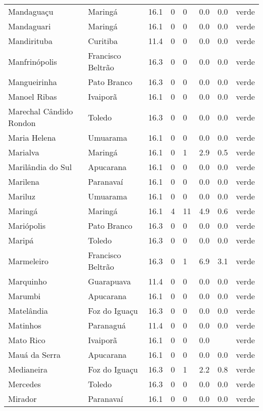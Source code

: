\begin{longtable}{l|lllllll}
  Mandaguaçu & Maringá & 16.1 & 0 & 0 & 0.0 & 0.0 & verde \\ 
  Mandaguari & Maringá & 16.1 & 0 & 0 & 0.0 & 0.0 & verde \\ 
  Mandirituba & Curitiba & 11.4 & 0 & 0 & 0.0 & 0.0 & verde \\ 
  Manfrinópolis & Francisco Beltrão & 16.3 & 0 & 0 & 0.0 & 0.0 & verde \\ 
  Mangueirinha & Pato Branco & 16.3 & 0 & 0 & 0.0 & 0.0 & verde \\ 
  Manoel Ribas & Ivaiporã & 16.1 & 0 & 0 & 0.0 & 0.0 & verde \\ 
  Marechal Cândido Rondon & Toledo & 16.3 & 0 & 0 & 0.0 & 0.0 & verde \\ 
  Maria Helena & Umuarama & 16.1 & 0 & 0 & 0.0 & 0.0 & verde \\ 
  Marialva & Maringá & 16.1 & 0 & 1 & 2.9 & 0.5 & verde \\ 
  Marilândia do Sul & Apucarana & 16.1 & 0 & 0 & 0.0 & 0.0 & verde \\ 
  Marilena & Paranavaí & 16.1 & 0 & 0 & 0.0 & 0.0 & verde \\ 
  Mariluz & Umuarama & 16.1 & 0 & 0 & 0.0 & 0.0 & verde \\ 
  Maringá & Maringá & 16.1 & 4 & 11 & 4.9 & 0.6 & verde \\ 
  Mariópolis & Pato Branco & 16.3 & 0 & 0 & 0.0 & 0.0 & verde \\ 
  Maripá & Toledo & 16.3 & 0 & 0 & 0.0 & 0.0 & verde \\ 
  Marmeleiro & Francisco Beltrão & 16.3 & 0 & 1 & 6.9 & 3.1 & verde \\ 
  Marquinho & Guarapuava & 11.4 & 0 & 0 & 0.0 & 0.0 & verde \\ 
  Marumbi & Apucarana & 16.1 & 0 & 0 & 0.0 & 0.0 & verde \\ 
  Matelândia & Foz do Iguaçu & 16.3 & 0 & 0 & 0.0 & 0.0 & verde \\ 
  Matinhos & Paranaguá & 11.4 & 0 & 0 & 0.0 & 0.0 & verde \\ 
  Mato Rico & Ivaiporã & 16.1 & 0 & 0 & 0.0 &  & verde \\ 
  Mauá da Serra & Apucarana & 16.1 & 0 & 0 & 0.0 & 0.0 & verde \\ 
  Medianeira & Foz do Iguaçu & 16.3 & 0 & 1 & 2.2 & 0.8 & verde \\ 
  Mercedes & Toledo & 16.3 & 0 & 0 & 0.0 & 0.0 & verde \\ 
  Mirador & Paranavaí & 16.1 & 0 & 0 & 0.0 & 0.0 & verde \\ 

\end{longtable}
